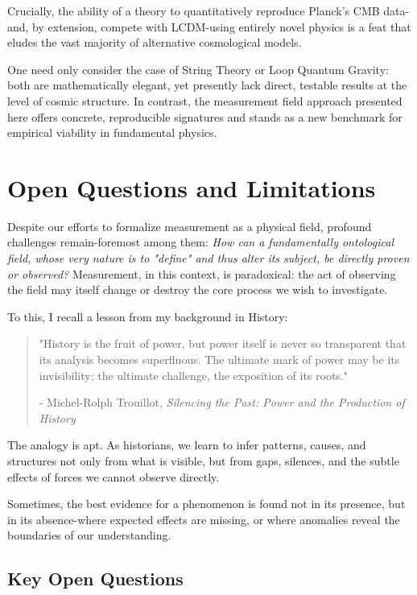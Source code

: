 Crucially, the ability of a theory to quantitatively reproduce Planck's CMB data-and, by extension, compete with LCDM-using entirely novel physics is a feat that eludes the vast majority of alternative cosmological models.

One need only consider the case of String Theory or Loop Quantum Gravity: both are mathematically elegant, yet presently lack direct, testable results at the level of cosmic structure. In contrast, the measurement field approach presented here offers concrete, reproducible signatures and stands as a new benchmark for empirical viability in fundamental physics.

\section{Open Questions and Limitations}

Despite our efforts to formalize measurement as a physical field, profound challenges remain-foremost among them: \emph{How can a fundamentally ontological field, whose very nature is to "define" and thus alter its subject, be directly proven or observed?} Measurement, in this context, is paradoxical: the act of observing the field may itself change or destroy the core process we wish to investigate.

To this, I recall a lesson from my background in History:

\begin{quote}
"History is the fruit of power, but power itself is never so transparent that its analysis becomes superfluous. The ultimate mark of power may be its invisibility; the ultimate challenge, the exposition of its roots."
\begin{flushright}
- Michel-Rolph Trouillot, \emph{Silencing the Past: Power and the Production of History}
\end{flushright}
\end{quote}

The analogy is apt. As historians, we learn to infer patterns, causes, and structures not only from what is visible, but from gaps, silences, and the subtle effects of forces we cannot observe directly.

Sometimes, the best evidence for a phenomenon is found not in its presence, but in its absence-where expected effects are missing, or where anomalies reveal the boundaries of our understanding.

\subsection*{Key Open Questions}

